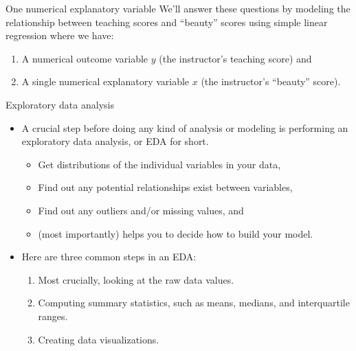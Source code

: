 \documentclass[
  ignorenonframetext,
]{beamer}
\providecommand{\tightlist}{%
  \setlength{\itemsep}{0pt}\setlength{\parskip}{0pt}}
\begin{document}
\begin{frame}{One numerical explanatory variable}
\protect\hypertarget{one-numerical-explanatory-variable-2}{}
We'll answer these questions by modeling the relationship between
teaching scores and ``beauty'' scores using simple linear regression
where we have:

\begin{enumerate}
\item
  A numerical outcome variable \(y\) (the instructor's teaching score)
  and
\item
  A single numerical explanatory variable \(x\) (the instructor's
  ``beauty'' score).
\end{enumerate}
\end{frame}

\begin{frame}{Exploratory data analysis}
\protect\hypertarget{exploratory-data-analysis}{}
\begin{itemize}
\item
  A crucial step before doing any kind of analysis or modeling is
  performing an exploratory data analysis, or EDA for short.

  \begin{itemize}
  \tightlist
  \item
    Get distributions of the individual variables in your data,
  \item
    Find out any potential relationships exist between variables,
  \item
    Find out any outliers and/or missing values, and
  \item
    (most importantly) helps you to decide how to build your model.
  \end{itemize}
\item
  Here are three common steps in an EDA:

  \begin{enumerate}
  \tightlist
  \item
    Most crucially, looking at the raw data values.
  \item
    Computing summary statistics, such as means, medians, and
    interquartile ranges.
  \item
    Creating data visualizations.
  \end{enumerate}
\end{itemize}
\end{frame}
\end{document}
